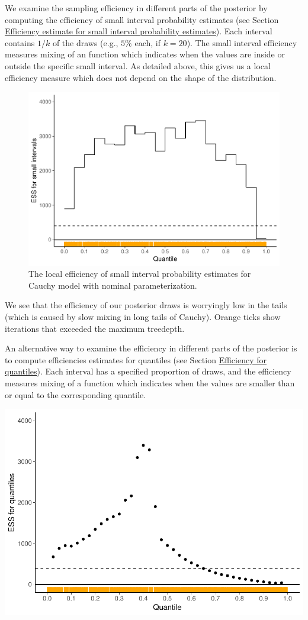 \documentclass[american,]{article}
\begin{document}
We examine the sampling efficiency in different parts of the posterior
by computing the efficiency of small interval probability estimates (see
Section \protect\hyperlink{small_interval_S_eff}{Efficiency estimate for
small interval probability estimates}). Each interval contains \(1/k\)
of the draws (e.g., \(5\%\) each, if \(k=20\)). The small interval
efficiency measures mixing of an function which indicates when the
values are inside or outside the specific small interval. As detailed
above, this gives us a local efficiency measure which does not depend on
the shape of the distribution.
\begin{figure}[t]
  \centering
  \includegraphics[width=0.7\linewidth]{graphics/local-ess-fit-nom-1.pdf}
  \caption{The local efficiency of small interval probability estimates for Cauchy model with nominal parameterization.}
\label{fig:local-ess-fit-nom-1}
\end{figure}

We see that the efficiency of our posterior draws is worryingly low in
the tails (which is caused by slow mixing in long tails of Cauchy).
Orange ticks show iterations that exceeded the maximum treedepth.

An alternative way to examine the efficiency in different parts of the
posterior is to compute efficiencies estimates for quantiles (see
Section \protect\hyperlink{quantile_S_eff}{Efficiency for quantiles}).
Each interval has a specified proportion of draws, and the efficiency
measures mixing of a function which indicates when the values are
smaller than or equal to the corresponding quantile.

\includegraphics{graphics/quantile-ess-fit-nom-1.pdf}
\end{document}
